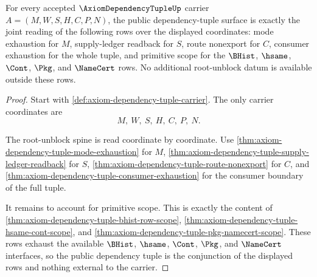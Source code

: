 \begin{theorem}
\label{thm:axiom-dependency-tuple-root-unblock-spine}
For every accepted $\AxiomDependencyTupleUp$ carrier
$A=(M,W,S,H,C,P,N)$, the public dependency-tuple surface is exactly the joint
reading of the following rows over the displayed coordinates: mode exhaustion
for $M$, supply-ledger readback for $S$, route nonexport for $C$, consumer
exhaustion for the whole tuple, and primitive scope for the $\BHist$, $\hsame$,
$\Cont$, $\Pkg$, and $\NameCert$ rows. No additional root-unblock datum is
available outside these rows.
\end{theorem}
\begin{proof}
Start with \autoref{def:axiom-dependency-tuple-carrier}. The only carrier
coordinates are
$$
M,\ W,\ S,\ H,\ C,\ P,\ N.
$$

The root-unblock spine is read coordinate by coordinate. Use
\autoref{thm:axiom-dependency-tuple-mode-exhaustion} for $M$,
\autoref{thm:axiom-dependency-tuple-supply-ledger-readback} for $S$,
\autoref{thm:axiom-dependency-tuple-route-nonexport} for $C$, and
\autoref{thm:axiom-dependency-tuple-consumer-exhaustion} for the consumer
boundary of the full tuple.

It remains to account for primitive scope. This is exactly the content of
\autoref{thm:axiom-dependency-tuple-bhist-row-scope},
\autoref{thm:axiom-dependency-tuple-hsame-cont-scope}, and
\autoref{thm:axiom-dependency-tuple-pkg-namecert-scope}. These rows exhaust the
available $\BHist$, $\hsame$, $\Cont$, $\Pkg$, and $\NameCert$ interfaces, so the
public dependency tuple is the conjunction of the displayed rows and nothing
external to the carrier.
\end{proof}

